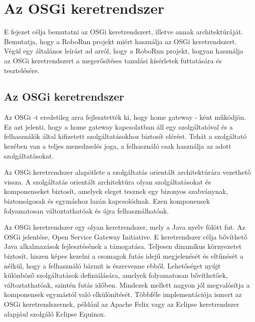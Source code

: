 \chapter{Az OSGi keretrendszer}\label{ch:OSGI}

\begin{osszefoglal}
	E fejezet célja bemutatni az OSGi keretrendszert, illetve annak architektúráját. Bemutatja, hogy a RoboRun projekt miért használja az OSGi keretrendszert. Végül egy általános leírást ad arról, hogy a RoboRun projekt, hogyan használja az OSGi keretrendszert a megerősítéses tanulási kísérletek futtatására és tesztelésére.
\end{osszefoglal}


\section{Az OSGi keretrendszer}\label{sec:OSGI_keretrendszer}
Az OSGi -t eredetileg arra fejlesztették ki, hogy home gateway - ként működjön. Ez azt jelenti, hogy a home gateway kapcsolatban áll egy szolgáltatóval és a felhasználók által kifizetett szolgáltatásokhoz biztosít elérést. Tehát a szolgáltató kezében  van a teljes menedzselés joga, a felhasználó csak használja az adott szolgáltatásokat. 
	
Az OSGi keretrendszer alapötlete a szolgáltatás orientált architektúrára\cite{szolg} vezethető vissza. A szolgáltatás orientált architektúra olyan szolgáltatásokat és komponenseket biztosít, amelyek eleget tesznek egy bizonyos szabványnak, biztonságosak és egymáshoz lazán kapcsolódnak. Ezen komponensek folyamatosan változtathatóak és újra felhasználhatóak.

Az OSGi keretrendszer egy olyan keretrendszer, mely a Java nyelv fölött fut. Az OSGi jelentése, Open Service Gateway Initiative. E keretrendszer célja bővíthető Java alkalmazások fejlesztésének a támogatása. Teljesen dinamikus környezetet biztosít, hiszen képes kezelni a csomagok futás idejű megjelenését és eltűnését a nélkül, hogy a felhasználó bármit is észrevenne ebből. Lehetőséget nyújt különböző szolgáltatások definiálására, amelyek folyamatosan bővíthetőek, változtathatóak, szintén futás időben. Mindezek mellett nagyon jól megvalósítja a komponensek egymástól való elkülönítését. Többféle implementációja ismert az OSGi keretrendszernek, például az Apache Felix\cite{apache} vagy az Eclipse keretrendszer alapjául szolgáló Eclipse Equinox\cite{equinox}.
	   

